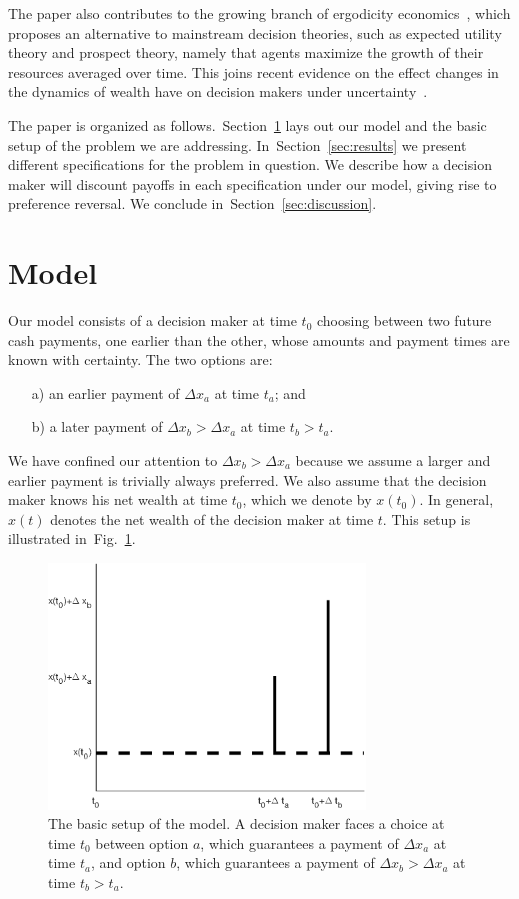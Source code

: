 \documentclass[11pt]{article}
\newcommand{\Sref}[1]{Section~\ref{sec:#1}}
\newcommand{\flabel}[1]{\label{fig:#1}}
\newcommand{\fref}[1]{Fig.~\ref{fig:#1}}
\newcommand{\Dx}{\Delta x}
\numberwithin{equation}{section}
\begin{document}
The paper also contributes to the growing branch of ergodicity economics~\citep{peters2016evaluating,berman2016far,peters2018time}, which proposes an alternative to mainstream decision theories, such as expected utility theory and prospect theory, namely that agents maximize the growth of their resources averaged over time. This joins recent evidence on the effect changes in the dynamics of wealth have on decision makers under uncertainty~\citep{hulme2019unpublished}.

The paper is organized as follows.~\Sref{model} lays out our model and the basic setup of the problem we are addressing. In~\Sref{results} we present different specifications for the problem in question. We describe how a decision maker will discount payoffs in each specification under our model, giving rise to preference reversal. We conclude in~\Sref{discussion}.

\section{Model}\label{sec:model}

Our model consists of a decision maker at time $t_0$ choosing between two future cash payments, one earlier than the other, whose amounts and payment times are known with certainty. The two options are:
\begin{enumerate}
\item[a)] an earlier payment of $\Dx_a$ at time $t_a$; and
\item[b)] a later payment of $\Dx_b>\Dx_a$ at time $t_b>t_a$.
\end{enumerate}
We have confined our attention to $\Dx_b>\Dx_a$ because we assume a larger and earlier payment is trivially always preferred. We also assume that the decision maker knows his net wealth at time $t_0$, which we denote by $x\left(t_0\right)$. In general, $x\left(t\right)$ denotes the net wealth of the decision maker at time $t$. This setup is illustrated in~\fref{basicsetup}.

\begin{figure}[!htb]
\centering
\includegraphics[width=0.75\textwidth]{./figures/basicsetup.eps}
\caption{The basic setup of the model. A decision maker faces a choice at time $t_0$ between option $a$, which guarantees a payment of $\Dx_a$ at time $t_a$, and option $b$, which guarantees a payment of $\Dx_b>\Dx_a$ at time $t_b>t_a$.}
\flabel{basicsetup}
\end{figure}
\end{document}

